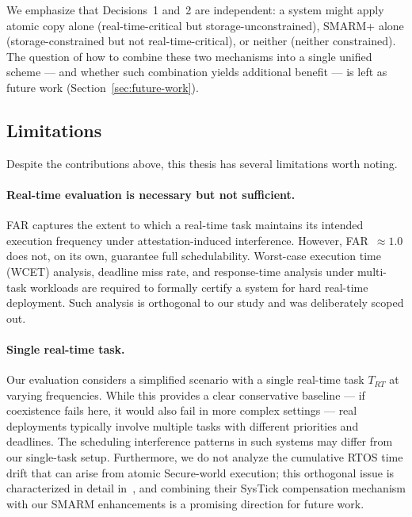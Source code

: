 \documentclass[a4paper,10pt]{article}
\begin{document}
{We emphasize that Decisions~1 and~2 are independent: a system 
might apply atomic copy alone (real-time-critical but 
storage-unconstrained), SMARM+ alone (storage-constrained but 
not real-time-critical), or neither (neither constrained). The 
question of how to combine these two mechanisms into a single 
unified scheme — and whether such combination yields additional 
benefit — is left as future work 
(Section~\ref{sec:future-work}).

\subsection{Limitations}
\label{sec:limitations}

Despite the contributions above, this thesis has several 
limitations worth noting.

\paragraph{Real-time evaluation is necessary but not sufficient.}
FAR captures the extent to which a real-time task maintains its 
intended execution frequency under attestation-induced 
interference. However, FAR~$\approx 1.0$ does not, on its own, 
guarantee full schedulability. Worst-case execution time (WCET) 
analysis, deadline miss rate, and response-time analysis under 
multi-task workloads are required to formally certify a system 
for hard real-time deployment. Such analysis is orthogonal to 
our study and was deliberately scoped out.

\paragraph{Single real-time task.}
Our evaluation considers a simplified scenario with a single 
real-time task $T_{RT}$ at varying frequencies. While this 
provides a clear conservative baseline — if coexistence fails 
here, it would also fail in more complex settings — real 
deployments typically involve multiple tasks with different 
priorities and deadlines. The scheduling interference patterns 
in such systems may differ from our single-task setup.
Furthermore, we do not analyze the cumulative RTOS time drift
that can arise from atomic Secure-world execution;
this orthogonal issue is characterized in
detail in~\cite{joianeto2026iccad}, and combining their
SysTick compensation mechanism with our SMARM enhancements
is a promising direction for future work.

}
\end{document}
